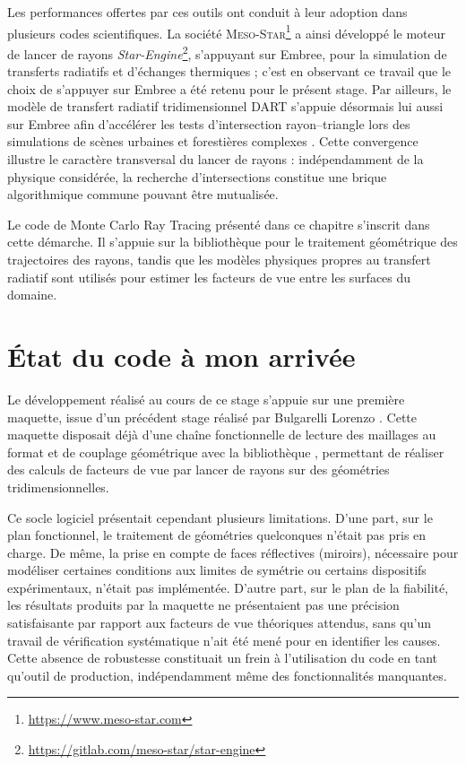 Les performances offertes par ces outils ont conduit à leur adoption dans plusieurs codes scientifiques. La société \textsc{Meso-Star}\footnote{\url{https://www.meso-star.com}} a ainsi développé le moteur de lancer de rayons \textit{Star-Engine}\footnote{\url{https://gitlab.com/meso-star/star-engine}}, s'appuyant sur Embree, pour la simulation de transferts radiatifs et d'échanges thermiques ; c'est en observant ce travail que le choix de s'appuyer sur Embree a été retenu pour le présent stage. Par ailleurs, le modèle de transfert radiatif tridimensionnel \textsc{DART} s'appuie désormais lui aussi sur Embree afin d'accélérer les tests d'intersection rayon--triangle lors des simulations de scènes urbaines et forestières complexes \cite{Qi2019HybridScene}. Cette convergence illustre le caractère transversal du lancer de rayons : indépendamment de la physique considérée, la recherche d'intersections constitue une brique algorithmique commune pouvant être mutualisée.

Le code de Monte Carlo Ray Tracing présenté dans ce chapitre s'inscrit dans cette démarche. Il s'appuie sur la bibliothèque \emb pour le traitement géométrique des trajectoires des rayons, tandis que les modèles physiques propres au transfert radiatif sont utilisés pour estimer les facteurs de vue entre les surfaces du domaine. 


\section{État du code à mon arrivée}

Le développement réalisé au cours de ce stage s'appuie sur une première maquette, issue d'un précédent stage réalisé par Bulgarelli Lorenzo \cite{lorenzo}. Cette maquette disposait déjà d'une chaîne fonctionnelle de lecture des maillages au format  et de couplage géométrique avec la bibliothèque \emb, permettant de réaliser des calculs de facteurs de vue par lancer de rayons sur des géométries tridimensionnelles.

Ce socle logiciel présentait cependant plusieurs limitations. D'une part, sur le plan fonctionnel, le traitement de géométries quelconques n'était pas pris en charge. De même, la prise en compte de faces réflectives (miroirs), nécessaire pour modéliser certaines conditions aux limites de symétrie ou certains dispositifs expérimentaux, n'était pas implémentée. D'autre part, sur le plan de la fiabilité, les résultats produits par la maquette ne présentaient pas une précision satisfaisante par rapport aux facteurs de vue théoriques attendus, sans qu'un travail de vérification systématique n'ait été mené pour en identifier les causes. Cette absence de robustesse constituait un frein à l'utilisation du code en tant qu'outil de production, indépendamment même des fonctionnalités manquantes.

